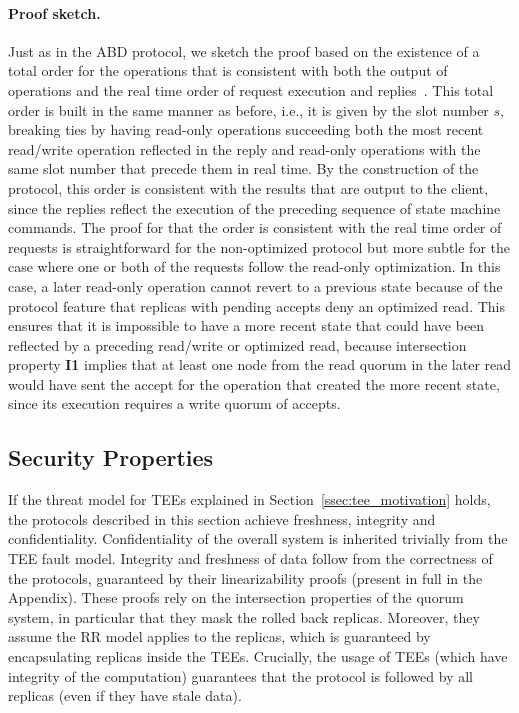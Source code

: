 \paragraph{Proof sketch.}
Just as in the \ac{ABD} protocol, we sketch the proof based on
the existence of a total order for the operations that is
consistent with both the output of operations and the real time
order of request execution and replies~\cite{nancy-book}. This
total order is built in the same manner as before, i.e., it is
given by the slot number $s$, breaking ties by having read-only
operations succeeding both the most recent read/write operation
reflected in the reply and read-only operations with the
same slot number that precede them in real time. By the
construction of the protocol, this order is consistent with the
results that are output to the client, since the replies reflect
the execution of the preceding sequence of state machine commands.
The proof for that the order is consistent with
the real time order of requests is straightforward for the
non-optimized protocol but more subtle for the case where one or
both of the requests follow the read-only optimization.
In this case, a later read-only operation cannot revert to a
previous state because of the protocol feature that replicas with
pending accepts deny an optimized read.  This ensures that
it is impossible to have a more recent state
that could have been reflected by a preceding read/write or
optimized read, because intersection property \textbf{I1} implies
that at least one node from the read quorum in the later read
would have sent the accept for the operation that created the
more recent state, since its execution requires a write quorum of
accepts.


\subsection{Security Properties}\label{ssec:sec_prop}
If the threat model for \acp{TEE} explained in
Section~\ref{ssec:tee_motivation} holds, the protocols described in this
section achieve freshness, integrity and confidentiality.
Confidentiality of the overall system is inherited trivially from the
\ac{TEE} fault model. Integrity and freshness of data follow from the
correctness of the protocols, guaranteed by their linearizability
proofs (present in full in the Appendix). These proofs rely on
the intersection properties of the quorum system, in particular
that they mask the rolled back replicas. Moreover, they assume the
\ac{RR} model applies to the replicas, which is
guaranteed by encapsulating replicas inside the \acp{TEE}. Crucially,
the usage of \acp{TEE} (which have integrity of the computation)
guarantees that the protocol is followed by all replicas (even if
they have stale data).

